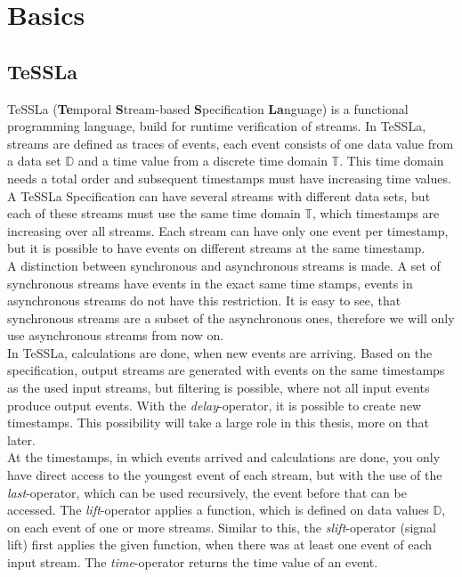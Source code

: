 
\chapter{Basics}
\label{chapter-basics}

\section{TeSSLa}

TeSSLa (\textbf{Te}mporal \textbf{S}tream-based \textbf{S}pecification \textbf{La}nguage) is a functional programming language, build for runtime verification of streams. In TeSSLa, streams are defined as traces of events, each event consists of one data value from a data set $\mathbb D$ and a time value from a discrete time domain $\mathbb T$. This time domain needs a total order and subsequent timestamps must have increasing time values. A TeSSLa Specification can have several streams with different data sets, but each of these streams must use the same time domain $\mathbb T$, which timestamps are increasing over all streams. Each stream can have only one event per timestamp, but it is possible to have events on different streams at the same timestamp.\\
A distinction between synchronous and asynchronous streams is made. A set of synchronous streams have events in the exact same time stamps, events in asynchronous streams do not have this restriction. It is easy to see, that synchronous streams are a subset of the asynchronous ones, therefore we will only use asynchronous streams from now on.\\
In TeSSLa, calculations are done, when new events are arriving. Based on the specification, output streams are generated with events on the same timestamps as the used input streams, but filtering is possible, where not all input events produce output events. With the \emph{delay}-operator, it is possible to create new timestamps. This possibility will take a large role in this thesis, more on that later.\\
At the timestamps, in which events arrived and calculations are done, you only have direct access to the youngest event of each stream, but with the use of the \emph{last}-operator, which can be used recursively, the event before that can be accessed. The \emph{lift}-operator applies a function, which is defined on data values $\mathbb D$, on each event of one or more streams. Similar to this, the \emph{slift}-operator (signal lift) first applies the given function, when there was at least one event of each input stream. The \emph{time}-operator returns the time value of an event.\\

